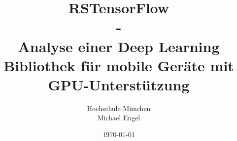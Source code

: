 \documentclass{IEEEtran}
\title{RSTensorFlow\\ - \\Analyse einer Deep Learning Bibliothek für mobile Geräte mit GPU-Unterstützung}
\author{Hochschule München \\ Michael Engel}
\date{\today}
\begin{document}
\maketitle











{}
\end{document}
